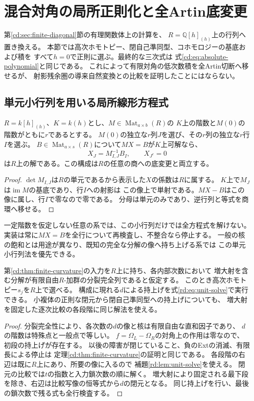 \section{混合対角の局所正則化と全Artin底変更}
\label{rd:sec:regular}

第\ref{cd:sec:finite-diagonal}節の有理関数体上の計算を、
$R=\mathbb Q[h]_{(h)}$上の行列へ置き換える。
本節では高次ホモトピー、閉自己準同型、コホモロジーの基底および積を
すべて$h=0$で正則に選ぶ。最終的な三次式は
式\eqref{cd:eq:absolute-polynomial}と同じである。
これによって有限対角の低次数積を全Artin切断へ移せるが、
射影残余圏の導来自然変換との比較を証明したことにはならない。

\subsection{単元小行列を用いる局所線形方程式}
\begin{lemma}[一定階数の単元小行列解法]\label{rd:lem:unit-solve}
$R=k[h]_{(h)}$、$K=k(h)$とし、$M\in\operatorname{Mat}_{a\times b}(R)$の
$K$上の階数と$M(0)$の階数がともに$r$であるとする。
$M(0)$の独立な$r$列$J$を選び、その$r$列の独立な$r$行$I$を選ぶ。
$B\in\operatorname{Mat}_{a\times s}(R)$について$MX=B$が$K$上可解なら、
\[
 X_J=M_{I,J}^{-1}B_I,\qquad X_{J^c}=0
 \tag{RD1}\label{rd:eq:unit-solve}
\]
は$R$上の解である。この構成は$R$の任意の商への底変更と両立する。
\end{lemma}
\begin{proof}
$\det M_{I,J}$は$R$の単元であるから表示した$X$の係数は$R$に属する。
$K$上で$M_J$は$\operatorname{im}M$の基底であり、行$I$への射影は
この像上で単射である。$MX-B$はこの像に属し、行$I$で零なので零である。
分母は単元のみであり、逆行列と等式を商環へ移せる。
\end{proof}

一定階数を仮定しない任意の系では、この小行列だけでは全方程式を解けない。
実装は常に$MX=B$を全行について再検査し、不整合なら停止する。
一般の核の飽和とは用途が異なり、既知の完全な分解の像へ持ち上げる系では
この単元小行列法を優先できる。

\begin{proposition}[有界分解の正則な曲率化]\label{rd:prop:regular-existence}
第\ref{cd:thm:finite-curvature}の入力を$R$上に持ち、各内部次数において
増大射を含む分解が有限自由$R$-加群の分裂完全列であると仮定する。
このとき高次ホモトピー$s_j$を$R$上で選べる。
構成に現れる$d$による持上げを式\eqref{rd:eq:unit-solve}で実行できる。
小複体の正則な閉元から閉自己準同型への持上げについても、
増大射を固定した逐次比較の各段階に同じ解法を使える。
\end{proposition}
\begin{proof}
分裂完全性により、各次数の$d$の像と核は有限自由な直和因子であり、
$d$の階数は特殊点と一般点で等しい。
$f=\Omega_L-\Omega_R$の対角上の作用は零なので、初段の持上げが存在する。
以後の障害が閉じていること、負のExtの消滅、有限長による停止は
定理\ref{cd:thm:finite-curvature}の証明と同じである。
各段階の右辺は既に$R$上にあり、所要の像に入るので
補題\ref{rd:lem:unit-solve}を使える。
閉元の比較では$t$の指数と入力鎖次数の順に解く。
増大射により固定される最下段を除き、右辺は比較写像の恒等式から$d$の閉元となる。
同じ持上げを行い、最後の鎖次数で残る式も全行検査する。
\end{proof}

